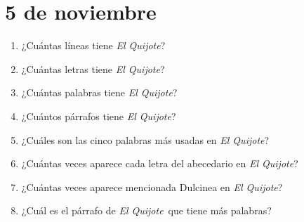 \documentclass[12pt,spanish]{article}
\def\eq{\emph{El Quijote}}
\begin{document}
  \section*{5 de noviembre}

  \begin{enumerate}[leftmargin=0pt]
    \item ¿Cuántas líneas tiene \eq?
    \item ¿Cuántas letras tiene \eq?
    \item ¿Cuántas palabras tiene \eq?
    \item ¿Cuántos párrafos tiene \eq?
    \item ¿Cuáles son las cinco palabras más usadas en \eq?
    \item ¿Cuántas veces aparece cada letra del abecedario en \eq?
    \item ¿Cuántas veces aparece mencionada Dulcinea en \eq?
    \item ¿Cuál es el párrafo de \eq\ que tiene más palabras?

  \end{enumerate}
\end{document}
